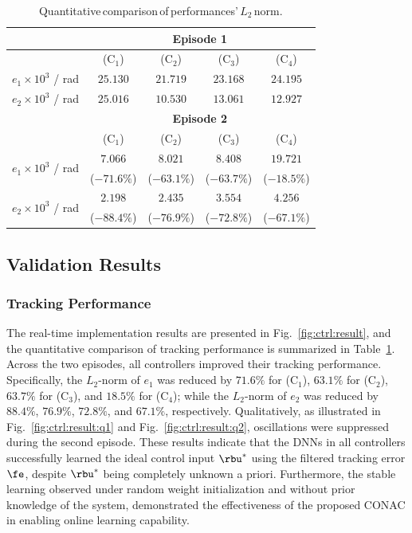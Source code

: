\documentclass[letterpaper, journal]{IEEEtran}
\begin{document}
\begin{table}[!t]
    \renewcommand{\arraystretch}{1.3}
    \caption{Quantitative\,comparison\,of\,performances'\,$L_2$\,norm.}
    \centering
    \begin{tabular}{c c c c c}
    \hline
		& \multicolumn{4}{c}{\textbf{Episode 1}} \\
    \hline
	\hline 
		& (C$_1$) & (C$_2$) & (C$_3$) & (C$_4$) \\
	\hline
		$e_1\times10^{3}$ / rad & $25.130$ & $21.719$ & $23.168$ & $24.195$ \\ 
	\hline
        $e_2\times10^{3}$ / rad & $25.016$ & $10.530$ & $13.061$ & $12.927$ \\
	\hline
        & \multicolumn{4}{c}{\textbf{Episode 2}} \\
    \hline
    \hline
        & (C$_1$) & (C$_2$) & (C$_3$) & (C$_4$) \\
	\hline
    \multirow{2}{*}{$e_1\times10^{3}$ / rad} 
        & $7.066$ & $8.021$ & $8.408$ & $19.721$ \\
        & ($-71.6\%$) & ($-63.1\%$) & ($-63.7\%$) & ($-18.5\%$) \\
    \hline
    \multirow{2}{*}{$e_2\times10^{3}$ / rad} 
        & $2.198$ & $2.435$ & $3.554$ & $4.256$ \\
        & ($-88.4\%$) & ($-76.9\%$) & ($-72.8\%$) & ($-67.1\%$) \\
    \hline
    \end{tabular}
    \label{tab:sim:L2}
\end{table}

\subsection{Validation Results}

\subsubsection{Tracking Performance}

The real-time implementation results are presented in Fig.~\ref{fig:ctrl:result}, and the quantitative comparison of tracking performance is summarized in Table~\ref{tab:sim:L2}.
Across the two episodes, all controllers improved their tracking performance. 
Specifically, the $L_2$-norm of $e_1$ was reduced by $71.6 \%$ for (C$_1$), $63.1 \%$ for (C$_2$), $63.7 \%$ for (C$_3$), and $18.5 \%$ for (C$_4$); while the $L_2$-norm of $e_2$ was reduced by $88.4 \%$, $76.9 \%$, $72.8 \%$, and $67.1 \%$, respectively.
Qualitatively, as illustrated in Fig.~\ref{fig:ctrl:result:q1} and Fig.~\ref{fig:ctrl:result:q2}, oscillations were suppressed during the second episode.
These results indicate that the DNNs in all controllers successfully learned the ideal control input $\rbu^*$ using the filtered tracking error $\fe$, despite $\rbu^*$ being completely unknown a priori.
Furthermore, the stable learning observed under random weight initialization and without prior knowledge of the system, demonstrated the effectiveness of the proposed CONAC in enabling online learning capability.
\end{document}
